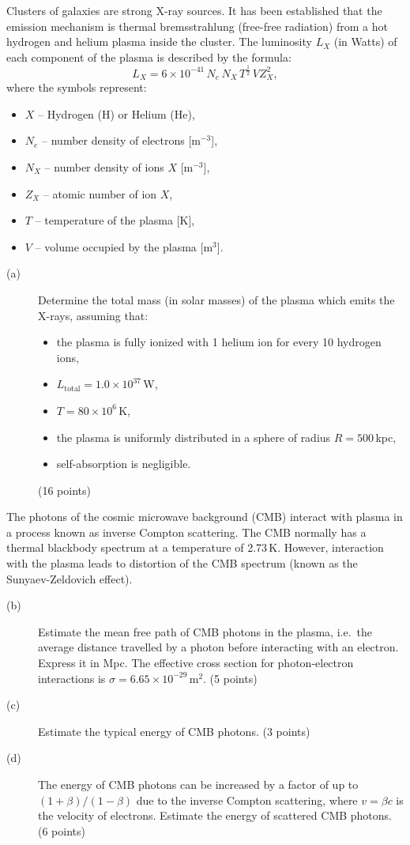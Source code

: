 Clusters of galaxies are strong X-ray sources. It has been established that
the emission mechanism is thermal bremsstrahlung (free-free radiation) from a
hot hydrogen and helium plasma inside the cluster. The luminosity $L_X$ (in
Watts) of each component of the plasma is described by the formula:
\[ L_X = 6 \times 10^{-41}\, N_e\, N_X\, T^{\frac{1}{2}}\, V Z_X^2, \]
where the symbols represent:
\begin{itemize}
\item $X$ -- Hydrogen (H) or Helium (He),
\item $N_e$ -- number density of electrons [$\mathrm{m}^{-3}$],
\item $N_X$ -- number density of ions $X$ [$\mathrm{m}^{-3}$],
\item $Z_X$ -- atomic number of ion $X$,
\item $T$ -- temperature of the plasma [K],
\item $V$ -- volume occupied by the plasma [$\mathrm{m}^3$].
\end{itemize}

\begin{description}
\item[(a)] Determine the total mass (in solar masses) of the plasma which
  emits the X-rays, assuming that:
  \begin{itemize}
  \item the plasma is fully ionized with 1 helium ion for every 10 hydrogen
    ions,
  \item $L_{\mathrm{total}} = 1.0 \times 10^{37}$\,W,
  \item $T = 80 \times 10^6$\,K,
  \item the plasma is uniformly distributed in a sphere of radius
    $R = 500$\,kpc,
  \item self-absorption is negligible.
  \end{itemize}
  \hfill(16 points)
\end{description}

The photons of the cosmic microwave background (CMB) interact with plasma in a
process known as inverse Compton scattering. The CMB normally has a thermal
blackbody spectrum at a temperature of 2.73\,K. However, interaction with the
plasma leads to distortion of the CMB spectrum (known as the
Sunyaev-Zeldovich effect).

\begin{description}
\item[(b)] Estimate the mean free path of CMB photons in the plasma, i.e.\ the
  average distance travelled by a photon before interacting with an electron.
  Express it in Mpc. The effective cross section for photon-electron
  interactions is $\sigma = 6.65 \times 10^{-29}$\,$\mathrm{m}^2$.
  \hfill(5 points)
\item[(c)] Estimate the typical energy of CMB photons. \hfill(3 points)
\item[(d)] The energy of CMB photons can be increased by a factor of up to
  $(1+\beta)/(1-\beta)$ due to the inverse Compton scattering, where
  $v = \beta c$ is the velocity of electrons. Estimate the energy of scattered
  CMB photons. \hfill(6 points)
\end{description}
